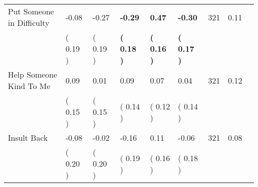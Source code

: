 \begin{tabular}{L{6.2cm} C{1.8cm} C{1.8cm} C{1.8cm} C{1.8cm} C{1.8cm} C{1.8cm} C{0.3cm} C{0.3cm}}
Put Someone in Difficulty &     -0.08 &     -0.27 & \textbf{    -0.29} & \textbf{     0.47} & \textbf{    -0.30}  & 321 &       0.11 \\ 
 & (     0.19 ) & (     0.19 ) & \textbf{(     0.18 )} & \textbf{(     0.16 )} & \textbf{(     0.17 )}  & \\
Help Someone Kind To Me &      0.09 &      0.01 &      0.09 &      0.07 &      0.04  & 321 &       0.12 \\ 
 & (     0.15 ) & (     0.15 ) & (     0.14 ) & (     0.12 ) & (     0.14 )  & \\
Insult Back &     -0.08 &     -0.02 &     -0.16 &      0.11 &     -0.06  & 321 &       0.08 \\ 
 & (     0.20 ) & (     0.20 ) & (     0.19 ) & (     0.16 ) & (     0.18 )  & \\
\bottomrule
\end{tabular}
